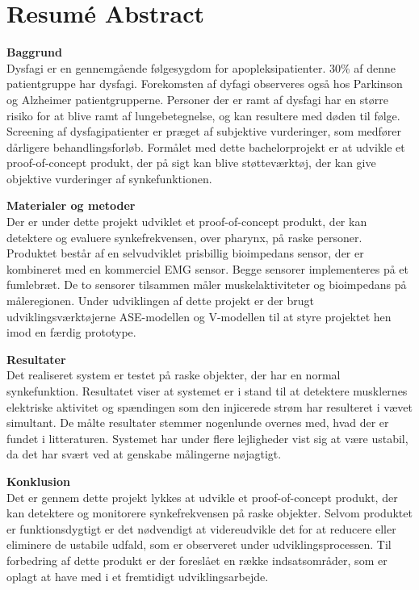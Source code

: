 \chapter{Resumé Abstract}

\textbf{Baggrund}\\
Dysfagi er en gennemgående følgesygdom for apopleksipatienter. 30\% af denne patientgruppe har dysfagi. Forekomsten af dyfagi observeres også hos Parkinson og Alzheimer patientgrupperne. Personer der er ramt af dysfagi har en større risiko for at blive ramt af lungebetegnelse, og kan resultere med døden til følge. Screening af dysfagipatienter er præget af subjektive vurderinger, som medfører dårligere behandlingsforløb. Formålet med dette bachelorprojekt er at udvikle et proof-of-concept produkt, der på sigt kan blive støtteværktøj, der kan give objektive vurderinger af synkefunktionen.

\textbf{Materialer og metoder}\\
Der er under dette projekt udviklet et proof-of-concept produkt, der kan detektere og evaluere synkefrekvensen, over pharynx, på raske personer. Produktet består af en selvudviklet prisbillig bioimpedans sensor, der er kombineret med en kommerciel EMG sensor. Begge sensorer implementeres på et fumlebræt. De to sensorer tilsammen måler  muskelaktiviteter og bioimpedans på måleregionen.   Under udviklingen af dette projekt er der brugt udviklingsværktøjerne ASE-modellen og V-modellen til at styre projektet hen imod en færdig prototype.  


\textbf{Resultater}\\
Det realiseret system er testet på raske objekter, der har en normal synkefunktion. Resultatet viser at systemet er i stand til at detektere musklernes elektriske aktivitet og spændingen som den injicerede strøm har resulteret i vævet simultant. De målte resultater stemmer nogenlunde overnes med, hvad der er fundet i litteraturen. Systemet har under flere lejligheder vist sig at være ustabil, da det har svært ved at genskabe målingerne nøjagtigt. 

\textbf{Konklusion}\\
Det er gennem dette projekt lykkes at udvikle et  proof-of-concept produkt, der kan detektere og monitorere synkefrekvensen på raske objekter. Selvom produktet  er funktionsdygtigt er det nødvendigt at videreudvikle det for at reducere eller eliminere de ustabile udfald, som er observeret under udviklingsprocessen. Til forbedring af dette produkt er der foreslået en række indsatsområder, som er oplagt at have med i et fremtidigt udviklingsarbejde.
